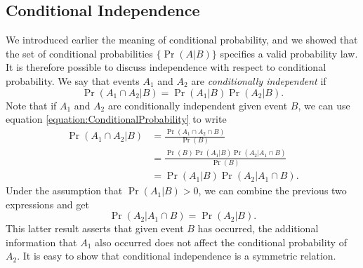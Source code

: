 \subsection{Conditional Independence}

We introduced earlier the meaning of conditional probability, and we showed that the set of conditional probabilities $\{ \Pr (A|B) \}$ specifies a valid probability law.
It is therefore possible to discuss independence with respect to conditional probability.
We say that events $A_1$ and $A_2$ are \emph{conditionally independent} if
\begin{equation*}
\Pr (A_1 \cap A_2 | B) = \Pr (A_1 | B) \Pr (A_2 | B) .
\end{equation*}
Note that if $A_1$ and $A_2$ are conditionally independent given event $B$, we can use equation \eqref{equation:ConditionalProbability} to write
\begin{equation*}
\begin{split}
\Pr (A_1 \cap A_2 | B) &= \frac{ \Pr (A_1 \cap A_2 \cap  B) }{\Pr (B)} \\
&= \frac{ \Pr (B) \Pr (A_1 | B) \Pr (A_2 | A_1 \cap  B) }{\Pr (B)} \\
&= \Pr (A_1 | B) \Pr (A_2 | A_1 \cap  B) .
\end{split}
\end{equation*}
Under the assumption that $\Pr (A_1 | B) > 0$, we can combine the previous two expressions and get
\begin{equation*}
\Pr (A_2 | A_1 \cap  B) = \Pr (A_2 | B) .
\end{equation*}
This latter result asserts that given event $B$ has occurred, the additional information that $A_1$ also occurred does not affect the conditional probability of $A_2$.
It is easy to show that conditional independence is a symmetric relation.

